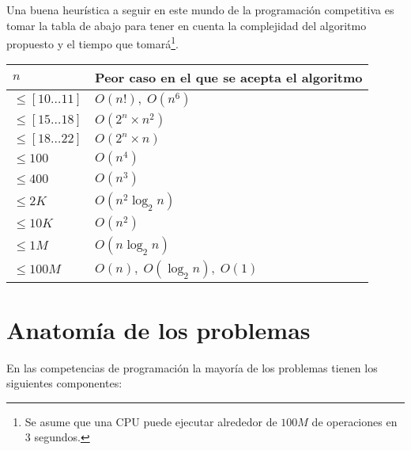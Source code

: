 Una buena heurística a seguir en este mundo de la programación competitiva es tomar la tabla de
abajo para tener en cuenta la complejidad del algoritmo propuesto y el tiempo que tomará\footnote{
    Se asume que una CPU puede ejecutar alrededor de $100M$ de operaciones en 3 segundos.
}.
\begin{table}[H]
\centering
\begin{tabular}{l|l}
\hline
$n$                   & Peor caso en el que se acepta el algoritmo  \\ \hline
$\leq [10 \ldots 11]$ & $O(n!), \; O(n^6)$                          \\
$\leq [15 \ldots 18]$ & $O(2^n \times n^2)$                         \\
$\leq [18 \ldots 22]$ & $O(2^n \times n)$                           \\
$\leq 100$            & $O(n^4)$                                    \\
$\leq 400$            & $O(n^3)$                                    \\
$\leq 2K$             & $O(n^2 \log_2 n)$                           \\
$\leq 10K$            & $O(n^2)$                                    \\
$\leq 1M$             & $O(n \log_2 n)$                             \\
$\leq 100M$           & $O(n), \; O(\log_2 n), \; O(1)$             \\ \hline
\end{tabular}
\end{table}

\section{Anatomía de los problemas}

En las competencias de programación la mayoría de los problemas tienen los siguientes componentes:

